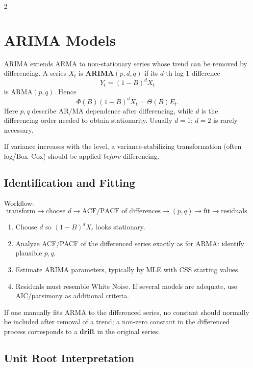 \documentclass[9pt,a4paper]{extarticle}
\newcommand{\key}[1]{\textbf{#1}}
\begin{document}
\begin{multicols}{2}
\raggedcolumns

\section{ARIMA Models}

ARIMA extends ARMA to non-stationary series whose trend can be removed by differencing. A series \(X_t\) is \key{ARIMA\((p,d,q)\)} if its \(d\)-th lag-1 difference
\[
Y_t=(1-B)^dX_t
\]
is ARMA\((p,q)\). Hence
\[
\boxed{\Phi(B)(1-B)^dX_t=\Theta(B)E_t}.
\]
Here \(p,q\) describe AR/MA dependence after differencing, while \(d\) is the differencing order needed to obtain stationarity. Usually \(d=1\); \(d=2\) is rarely necessary.

If variance increases with the level, a variance-stabilizing transformation (often log/Box--Cox) should be applied \emph{before} differencing.

\subsection{Identification and Fitting}

Workflow:
\[
\boxed{
\text{transform}\rightarrow
\text{choose }d\rightarrow
\text{ACF/PACF of differences}\rightarrow
(p,q)\rightarrow
\text{fit}\rightarrow
\text{residuals}
}.
\]

\begin{enumerate}
\item Choose \(d\) so \((1-B)^dX_t\) looks stationary.
\item Analyze ACF/PACF of the differenced series exactly as for ARMA: identify plausible \(p,q\).
\item Estimate ARIMA parameters, typically by MLE with CSS starting values.
\item Residuals must resemble White Noise. If several models are adequate, use AIC/parsimony as additional criteria.
\end{enumerate}

If one manually fits ARMA to the differenced series, no constant should normally be included after removal of a trend; a non-zero constant in the differenced process corresponds to a \key{drift} in the original series.

\subsection{Unit Root Interpretation}


\end{multicols}
\end{document}

